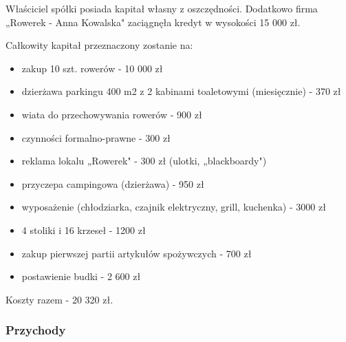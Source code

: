 \documentclass{sprawozdanie-agh}
\begin{document}
		Właściciel spółki posiada kapitał własny z oszczędności.
		Dodatkowo firma „Rowerek - Anna Kowalska" zaciągnęła kredyt w wysokości 15 000 zł. 
		
		Całkowity kapitał przeznaczony zostanie na:
		\begin{itemize}
			\item zakup 10 szt. rowerów	- 10 000  zł
			\item dzierżawa parkingu 400 m2 z 2 kabinami toaletowymi (miesięcznie) - 370 zł
			\item wiata do przechowywania rowerów - 900 zł
			\item czynności formalno-prawne	- 300 zł
			\item reklama lokalu „Rowerek" - 300 zł (ulotki, „blackboardy")
			\item przyczepa campingowa (dzierżawa)	-  950 zł
			\item wyposażenie (chłodziarka, czajnik	elektryczny, grill, kuchenka) - 3000 zł
			\item 4 stoliki i 16 krzeseł - 1200 zł
			\item zakup pierwszej partii artykułów spożywczych - 700 zł
			\item postawienie budki - 2 600 zł
		\end{itemize}
		
		Koszty razem - 20 320 zł.
		\subsubsection{Przychody}
\end{document}
